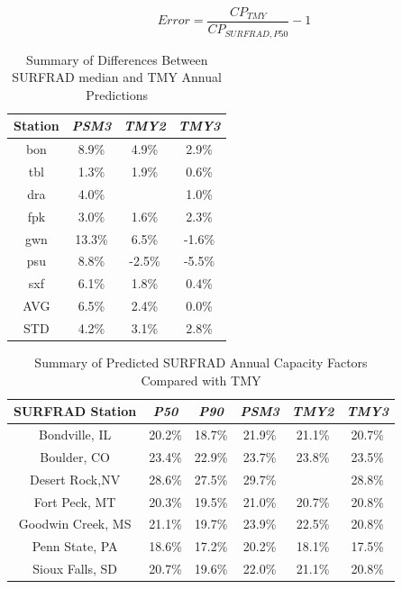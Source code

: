 \documentclass[conference]{IEEEtran}
\begin{document}
\begin{equation}
Error = \frac{CP_{TMY}}{CP_{SURFRAD,P50}}-1 \label{eq:tmy-surfrad-median-error}
\end{equation}

\begin{table}[htbp]
\caption{Summary of Differences Between SURFRAD median and TMY Annual Predictions}
\begin{center}
\begin{tabular}{|c|c|c|c|}
\hline
\textbf{Station}&\textbf{\textit{PSM3}}&\textbf{\textit{TMY2}}&\textbf{\textit{TMY3}} \\
\hline
bon&8.9\%&4.9\%&2.9\% \\
tbl&1.3\%&1.9\%&0.6\% \\
dra&4.0\%&     &1.0\% \\
fpk&3.0\%&1.6\%&2.3\% \\
gwn&13.3\%&6.5\%&-1.6\% \\
psu&8.8\%&-2.5\%&-5.5\% \\
sxf&6.1\%&1.8\%&0.4\% \\
\hline
AVG&6.5\%&2.4\%&0.0\% \\
STD&4.2\%&3.1\%&2.8\% \\
\hline
\end{tabular}
\label{table:surfrad-tmy-errors-summary}
\end{center}
\end{table}

\begin{table}[htbp]
\caption{Summary of Predicted SURFRAD Annual Capacity Factors Compared with TMY}
\begin{center}
\begin{tabular}{|c|c|c|c|c|c|}
\hline
\textbf{SURFRAD Station} & \textbf{\textit{P50}}& \textbf{\textit{P90}}& \textbf{\textit{PSM3}}& \textbf{\textit{TMY2}}& \textbf{\textit{TMY3}} \\
\hline
Bondville, IL    & 20.2\%& 18.7\%& 21.9\%& 21.1\%& 20.7\% \\
Boulder, CO      & 23.4\%& 22.9\%& 23.7\%& 23.8\%& 23.5\% \\
Desert Rock,NV   & 28.6\%& 27.5\%& 29.7\%&       & 28.8\% \\
Fort Peck, MT    & 20.3\%& 19.5\%& 21.0\%& 20.7\%& 20.8\% \\
Goodwin Creek, MS& 21.1\%& 19.7\%& 23.9\%& 22.5\%& 20.8\% \\
Penn State, PA   & 18.6\%& 17.2\%& 20.2\%& 18.1\%& 17.5\% \\
Sioux Falls, SD  & 20.7\%& 19.6\%& 22.0\%& 21.1\%& 20.8\% \\
\hline
\end{tabular}
\label{table:surfrad-tmy-summary}
\end{center}
\end{table}
\end{document}
